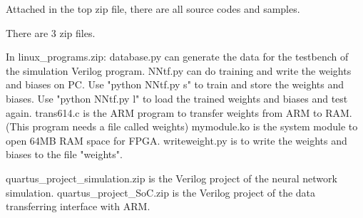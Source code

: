 \documentclass[conference]{IEEEtran}
\begin{document}
Attached in the top zip file, there are all source codes and samples.

There are 3 zip files.

In linux\_programs.zip:
database.py can generate the data for the testbench of the simulation Verilog program.
NNtf.py can do training and write the weights and biases on PC. Use "python NNtf.py s" to train and store the weights and biases. Use "python NNtf.py l" to load the trained weights and biases and test again.
trans614.c is the ARM program to transfer weights from ARM to RAM. (This program needs a file called weights)
mymodule.ko is the system module to open 64MB RAM space for FPGA.
writeweight.py is to write the weights and biases to the file "weights".

quartus\_project\_simulation.zip is the Verilog project of the neural network simulation.
quartus\_project\_SoC.zip is the Verilog project of the data transferring interface with ARM.


 {\scriptsize }
\end{document}
